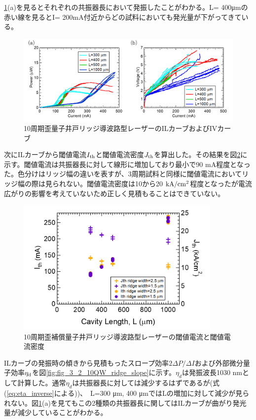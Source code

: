 {\ref{fig:fig_3_2_10QW_ridge_IL}(a)を見るとそれぞれの共振器長において発振したことがわかる。L= 400\si{\micro\metre}の赤い線を見るとI= 200mA付近からどの試料においても発光量が下がってきている。
\begin{figure}[h]
	\centering
	\includegraphics[width=15cm]{figure/fig_3_2_10QW_ridge_IL.png}
		\caption{10周期歪量子井戸リッジ導波路型レーザーのILカーブおよびIVカーブ}
		\label{fig:fig_3_2_10QW_ridge_IL}
\end{figure}
次にILカーブから閾値電流$I_{\rm{th}}$と閾値電流密度$J_{\rm{th}}$を算出した。その結果を図\ref{fig:fig_3_2_10QW_ridge_Ith}に示す。閾値電流は共振器長に対して線形に増加しており最小で90 mA程度となった。色分けはリッジ幅の違いを表すが、3周期試料と同様に閾値電流においてリッジ幅の際は見られない。閾値電流密度は10から20 $\rm{kA/cm^{2}}$程度となったが電流広がりの影響を考えていないため正しく見積もることはできていない。
\begin{figure}[h]
	\centering
	\includegraphics[width=10cm]{figure/fig_3_2_10QW_ridge_Ith.png}
		\caption{10周期歪補償量子井戸リッジ導波路型レーザーの閾値電流と閾値電流密度}
		\label{fig:fig_3_2_10QW_ridge_Ith}
\end{figure}
ILカーブの発振時の傾きから見積もったスロープ効率$2\Delta P/\Delta I$および外部微分量子効率$\eta_{\rm{d}}$を図\ref{fig:fig_3_2_10QW_ridge_slope}に示す。$\eta_{d}$は発振波長1030 nmとして計算した。通常$\eta_{d}$は共振器長に対しては減少するはずであるが(式(\ref{eq:eta_inverse}による))、　L=300 \si{\micro\metre},  400  \si{\micro\metre}ではLの増加に対して減少が見られない。図\ref{fig:fig_3_2_10QW_ridge_IL}(a)を見てもこの2種類の共振器長に関してはILカーブが曲がり発光量が減少していることがわかる。


}
